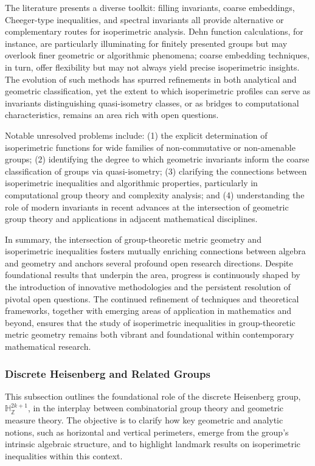 \documentclass[sigconf]{acmart}
\begin{document}
The literature presents a diverse toolkit: filling invariants, coarse embeddings, Cheeger-type inequalities, and spectral invariants all provide alternative or complementary routes for isoperimetric analysis. Dehn function calculations, for instance, are particularly illuminating for finitely presented groups but may overlook finer geometric or algorithmic phenomena; coarse embedding techniques, in turn, offer flexibility but may not always yield precise isoperimetric insights. The evolution of such methods has spurred refinements in both analytical and geometric classification, yet the extent to which isoperimetric profiles can serve as invariants distinguishing quasi-isometry classes, or as bridges to computational characteristics, remains an area rich with open questions.

Notable unresolved problems include: (1) the explicit determination of isoperimetric functions for wide families of non-commutative or non-amenable groups; (2) identifying the degree to which geometric invariants inform the coarse classification of groups via quasi-isometry; (3) clarifying the connections between isoperimetric inequalities and algorithmic properties, particularly in computational group theory and complexity analysis; and (4) understanding the role of modern invariants in recent advances at the intersection of geometric group theory and applications in adjacent mathematical disciplines.

In summary, the intersection of group-theoretic metric geometry and isoperimetric inequalities fosters mutually enriching connections between algebra and geometry and anchors several profound open research directions. Despite foundational results that underpin the area, progress is continuously shaped by the introduction of innovative methodologies and the persistent resolution of pivotal open questions. The continued refinement of techniques and theoretical frameworks, together with emerging areas of application in mathematics and beyond, ensures that the study of isoperimetric inequalities in group-theoretic metric geometry remains both vibrant and foundational within contemporary mathematical research.

\subsubsection{Discrete Heisenberg and Related Groups}

This subsection outlines the foundational role of the discrete Heisenberg group, $\mathbb{H}_{\mathbb{Z}}^{2k+1}$, in the interplay between combinatorial group theory and geometric measure theory. The objective is to clarify how key geometric and analytic notions, such as horizontal and vertical perimeters, emerge from the group’s intrinsic algebraic structure, and to highlight landmark results on isoperimetric inequalities within this context.
\end{document}
